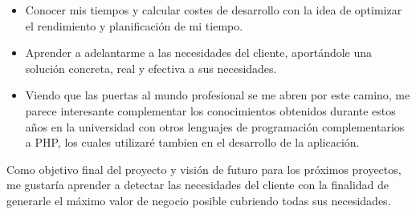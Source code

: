 \begin{itemize}
	\item Conocer mis tiempos y calcular costes de desarrollo con la idea de optimizar el rendimiento y planificación de mi tiempo.
	
	\item Aprender a adelantarme a las necesidades del cliente, aportándole una solución concreta, real y efectiva a sus necesidades.
	
	\item Viendo que las puertas al mundo profesional se me abren por este camino, me parece interesante complementar los conocimientos obtenidos durante estos años en la universidad con otros lenguajes de programación complementarios a PHP, los cuales utilizaré tambien en el desarrollo de la aplicación.
\end{itemize}

Como objetivo final del proyecto y visión de futuro para los próximos proyectos, me gustaría aprender a detectar las necesidades del cliente con la finalidad de generarle el máximo valor de negocio posible cubriendo todas sus necesidades.
